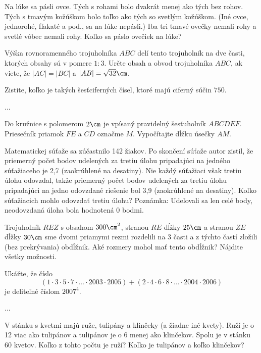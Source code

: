 {%
Na lúke sa pásli ovce. Tých s rohami bolo dvakrát menej ako tých bez rohov. Tých s tmavým
kožúškom bolo toľko ako tých so svetlým kožúškom. (Iné ovce, jednorohé, fľakaté a pod., sa
na lúke nepásli.) Iba tri tmavé ovečky nemali rohy a svetlé vôbec nemali rohy. Koľko sa páslo
ovečiek na lúke?}

{%
Výška rovnoramenného trojuholníka $ABC$ delí tento trojuholník na dve časti, ktorých obsahy
sú v pomere $1:3$. Určte obsah a obvod trojuholníka $ABC$, ak viete, že $|AC| = |BC|$ a $|AB| = \sqrt{32}\cm$.}

{%
Zistite, koľko je takých šesťciferných čísel, ktoré majú ciferný súčin $750$.}

{%
...}

{%
Do kružnice s polomerom $2\cm$ je vpísaný pravidelný šesťuholník $ABCDEF$. Priesečník
priamok $FE$ a $CD$ označme $M$. Vypočítajte dĺžku úsečky $AM$.}

{%
Matematickej súťaže sa zúčastnilo 142 žiakov. Po skončení súťaže autor zistil, že priemerný
počet bodov udelených za tretiu úlohu pripadajúci na jedného súťažiaceho je 2,7 (zaokrúhlené
na desatiny). Nie každý súťažiaci však tretiu úlohu odovzdal, takže priemerný počet bodov
udelených za tretiu úlohu pripadajúci na jedno odovzdané riešenie bol 3,9 (zaokrúhlené na
desatiny). Koľko súťažiacich mohlo odovzdať tretiu úlohu?
Poznámka: Udeľovali sa len celé body, neodovzdaná úloha bola hodnotená 0 bodmi.}

{%
Trojuholník $REZ$ s obsahom $300\cm^2$, stranou $RE$ dĺžky $25\cm$ a stranou $ZE$ dĺžky $30\cm$ sme
dvomi priamymi rezmi rozdelili na 3 časti a z týchto častí zložili (bez prekrývania) obdĺžnik.
Aké rozmery mohol mať tento obdĺžnik? Nájdite všetky možnosti.}

{%
Ukážte, že číslo
$$
(1 \cdot 3 \cdot 5 \cdot 7 \cdot \dots \cdot 2003 \cdot 2005 ) + (2 \cdot 4 \cdot 6 \cdot 8 \cdot \dots \cdot 2004 \cdot 2006)
$$
je deliteľné číslom $2007^4$.}

{%
...}

{%
V stánku s kvetmi majú ruže, tulipány a klinčeky (a žiadne iné kvety). Ruží je o 12 viac ako
tulipánov a tulipánov je o 6 menej ako klinčekov. Spolu je v stánku 60 kvetov. Koľko z tohto
počtu je ruží? Koľko je tulipánov a koľko klinčekov?}

